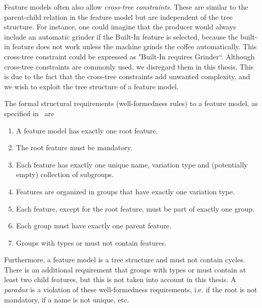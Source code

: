 Feature models often also allow \emph{cross-tree constraints}. These are similar to the parent-child relation in the feature model but are independent of the tree structure. For instance, one could imagine that the producer would always include an automatic grinder if the Built-In feature is selected, because the built-in feature does not work unless the machine grinds the coffee automatically. This cross-tree constraint could be expressed as "Built-In requires Grinder``. Although cross-tree constraints are commonly used, we disregard them in this thesis. This is due to the fact that the cross-tree constraints add unwanted complexity, and we wish to exploit the tree structure of a feature model.

The formal structural requirements (well-formedness rules) to a feature model, as specified in~\cite{art:consistency-preserving-evolution-planning} are 
\begin{enumerate}[\itbf{WF\arabic*}, itemsep=0mm]
   \label{wf-requirements}
   \item A feature model has exactly one root feature.
   \item The root feature must be mandatory.
   \item Each feature has exactly one unique name, variation type and (potentially empty) collection of subgroups.
   \item Features are organized in groups that have exactly one variation type.
   \item Each feature, except for the root feature, must be part of exactly one group.
   \item Each group must have exactly one parent feature.
   \item Groups with types \xortype{} or \ortype{} must not contain \mandatory{} features.
\end{enumerate}

Furthermore, a feature model is a tree structure and must not contain cycles. There is an additional requirement that groups with types \xortype{} or \ortype{} must contain at least two child features, but this is not taken into account in this thesis. A \emph{paradox} is a violation of these well-formedness requirements, i.e. if the root is not mandatory, if a name is not unique, etc.

